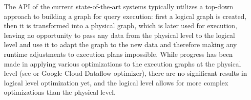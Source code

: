 The API of the current state-of-the-art systems typically utilizes a top-down approach to building a graph for query execution: first a logical graph is created, then it is transformed into a physical graph, which is later used for execution, leaving no opportunity to pass any data from the physical level to the logical level and use it to adapt the graph to the new data and therefore making any runtime adjustments to execution plans impossible. While progress has been made in applying various optimizations to the execution graphs at the physical level (see \cite{grulich2020grizzly} or Google Cloud Dataflow optimizer), there are no significant results in logical level optimization yet, and the logical level allows for more complex optimizations than the physical level.





